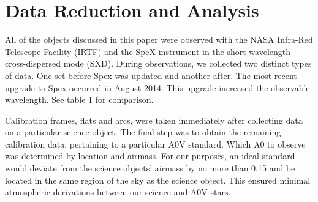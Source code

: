 \section{Data Reduction and Analysis}

All of the objects discussed in this paper were observed with the NASA Infra-Red Telescope Facility (IRTF) and the SpeX instrument \cite{Rayner_1998} in the short-wavelength cross-dispersed mode (SXD).  During observations, we collected two distinct types of data.  One set before Spex was updated and another after.  The most recent upgrade to Spex occurred in August 2014.  This upgrade increased the observable wavelength.  See table 1 for comparison.


Calibration frames, flats and arcs, were taken immediately after collecting data on a particular science object.  The final step was to obtain the remaining calibration data, pertaining to a particular A0V standard.  Which A0 to observe was determined by location and airmass.  For our purposes, an ideal standard would deviate from the science objects' airmass by no more than 0.15 and be located in the same region of the sky as the science object.  This ensured minimal atmospheric derivations between our science and A0V stars.
